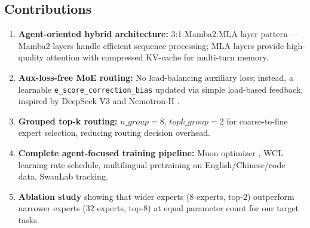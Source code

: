 \subsection{Contributions}

\begin{enumerate}
    \item \textbf{Agent-oriented hybrid architecture:} 3:1 Mamba2:MLA layer pattern --- Mamba2 layers handle efficient sequence processing; MLA layers provide high-quality attention with compressed KV-cache for multi-turn memory.
    \item \textbf{Aux-loss-free MoE routing:} No load-balancing auxiliary loss; instead, a learnable \texttt{e\_score\_correction\_bias} updated via simple load-based feedback, inspired by DeepSeek V3 \citep{deepseekv3} and Nemotron-H \citep{nemotron}.
    \item \textbf{Grouped top-k routing:} $n\_group=8$, $topk\_group=2$ for coarse-to-fine expert selection, reducing routing decision overhead.
    \item \textbf{Complete agent-focused training pipeline:} Muon optimizer \citep{muon}, WCL learning rate schedule, multilingual pretraining on English/Chinese/code data, SwanLab tracking.
    \item \textbf{Ablation study} showing that wider experts (8 experts, top-2) outperform narrower experts (32 experts, top-8) at equal parameter count for our target tasks.
\end{enumerate}
